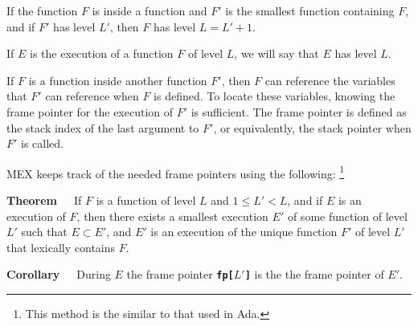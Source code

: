 \documentclass[12pt]{article}
\newcommand{\TT}[1]{{\tt \bfseries #1}}
\newenvironment{indpar}[1][0.3in]%
	{\begin{list}{}%
		     {\setlength{\itemsep}{0in}%
		      \setlength{\topsep}{0in}%
		      \setlength{\parsep}{1ex}%
		      \setlength{\labelwidth}{#1}%
		      \setlength{\leftmargin}{#1}%
		      \addtolength{\leftmargin}{\labelsep}}%
	 \item}%
	{\end{list}}
\begin{document}
If the function $F$ is inside a function and $F'$ is the smallest
function containing $F$, and if $F'$ has level $L'$, then $F$
has level $L=L'+1$.

If $E$ is the execution of a function $F$ of level $L$, we will
say that $E$ has level $L$.

If $F$ is a function inside another function $F'$, then $F$ can
reference the variables that $F'$ can reference when $F$ is
defined.  To locate these variables, knowing the frame pointer for the
execution of $F'$ is sufficient.  The frame pointer is defined as the
stack index of the last argument to $F'$, or equivalently, the stack
pointer when $F'$ is called.

MEX keeps track of the needed frame pointers using the following:%
\footnote{This method is the similar to that used in Ada.}
\begin{indpar}
{\bf Theorem}~~~If $F$ is a function of level $L$ and $1\le L'<L$,
and if $E$ is an execution of $F$, then there exists a smallest
execution $E'$ of some function of level $L'$ such that $E\subset E'$,
and $E'$ is an execution
of the unique function $F'$ of level $L'$ that lexically contains $F$.

{\bf Corollary}~~~During $E$ the frame pointer \TT{fp[$L'$]} is the
the frame pointer of $E'$.
\end{indpar}
\end{document}
